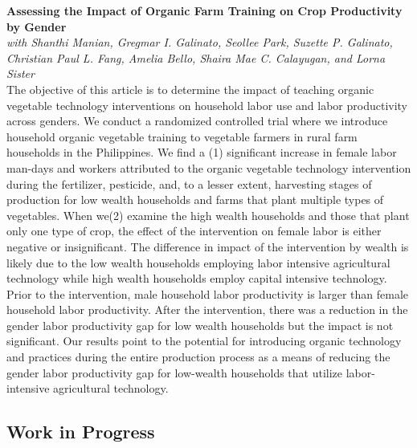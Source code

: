 \documentclass[11pt,letterpaper]{article}
\begin{document}
\textbf{Assessing the Impact of Organic Farm Training on Crop Productivity by Gender} \\
\textit{with Shanthi Manian, Gregmar I. Galinato, Seollee Park, Suzette P. Galinato, Christian Paul L. Fang, Amelia Bello, Shaira Mae C. Calayugan, and Lorna Sister} \\[4pt]
The objective of this article is to determine the impact of teaching organic vegetable  technology interventions on household labor use and labor productivity across genders. We conduct a randomized controlled trial where we introduce household organic vegetable training to vegetable farmers in rural farm households in the Philippines. We find a (1) significant increase in female labor man-days and workers attributed to the organic vegetable technology intervention during the fertilizer, pesticide, and, to a lesser extent, harvesting stages of production for low wealth households and farms that plant multiple types of vegetables. When we(2)  examine the high wealth households and those that plant only one type of crop, the effect of the intervention on female labor is either negative or insignificant. The difference in impact of the intervention by wealth is likely due to the low wealth households employing labor intensive agricultural technology while high wealth households employ capital intensive technology. Prior to the intervention, male household labor productivity is larger than female household labor productivity. After the intervention, there was a reduction in the gender labor productivity gap for low wealth households but the impact is not significant. Our results point to the potential for introducing organic technology and practices during the entire production process as a means of reducing the gender labor productivity gap for low-wealth households that utilize labor-intensive agricultural technology. 

\subsection{Work in Progress}
\end{document}
